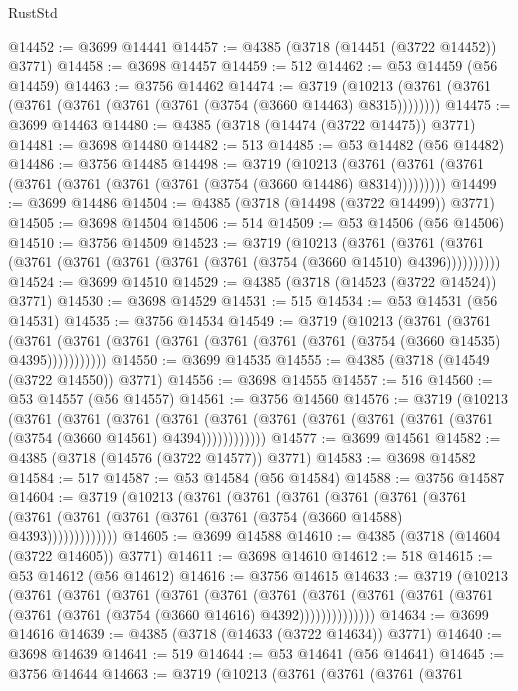 \begin{lexlean}{RustStd}
\begin{coremodule}
@14452 := @3699 @14441
@14457 := @4385 (@3718 (@14451 (@3722 @14452)) @3771)
@14458 := @3698 @14457
@14459 := 512
@14462 := @53 @14459 (@56 @14459)
@14463 := @3756 @14462
@14474 := @3719
    (@10213 (@3761 (@3761 (@3761 (@3761 (@3761 (@3761 (@3754 (@3660 @14463) @8315))))))))
@14475 := @3699 @14463
@14480 := @4385 (@3718 (@14474 (@3722 @14475)) @3771)
@14481 := @3698 @14480
@14482 := 513
@14485 := @53 @14482 (@56 @14482)
@14486 := @3756 @14485
@14498 := @3719
    (@10213 (@3761 (@3761 (@3761 (@3761 (@3761 (@3761 (@3761 (@3754 (@3660 @14486) @8314)))))))))
@14499 := @3699 @14486
@14504 := @4385 (@3718 (@14498 (@3722 @14499)) @3771)
@14505 := @3698 @14504
@14506 := 514
@14509 := @53 @14506 (@56 @14506)
@14510 := @3756 @14509
@14523 := @3719
    (@10213
      (@3761 (@3761 (@3761 (@3761 (@3761 (@3761 (@3761 (@3761 (@3754 (@3660 @14510) @4396))))))))))
@14524 := @3699 @14510
@14529 := @4385 (@3718 (@14523 (@3722 @14524)) @3771)
@14530 := @3698 @14529
@14531 := 515
@14534 := @53 @14531 (@56 @14531)
@14535 := @3756 @14534
@14549 := @3719
    (@10213
      (@3761
        (@3761
          (@3761 (@3761 (@3761 (@3761 (@3761 (@3761 (@3761 (@3754 (@3660 @14535) @4395)))))))))))
@14550 := @3699 @14535
@14555 := @4385 (@3718 (@14549 (@3722 @14550)) @3771)
@14556 := @3698 @14555
@14557 := 516
@14560 := @53 @14557 (@56 @14557)
@14561 := @3756 @14560
@14576 := @3719
    (@10213
      (@3761
        (@3761
          (@3761
            (@3761 (@3761 (@3761 (@3761 (@3761 (@3761 (@3761 (@3754 (@3660 @14561) @4394))))))))))))
@14577 := @3699 @14561
@14582 := @4385 (@3718 (@14576 (@3722 @14577)) @3771)
@14583 := @3698 @14582
@14584 := 517
@14587 := @53 @14584 (@56 @14584)
@14588 := @3756 @14587
@14604 := @3719
    (@10213
      (@3761
        (@3761
          (@3761
            (@3761
              (@3761
                (@3761 (@3761 (@3761 (@3761 (@3761 (@3761 (@3754 (@3660 @14588) @4393)))))))))))))
@14605 := @3699 @14588
@14610 := @4385 (@3718 (@14604 (@3722 @14605)) @3771)
@14611 := @3698 @14610
@14612 := 518
@14615 := @53 @14612 (@56 @14612)
@14616 := @3756 @14615
@14633 := @3719
    (@10213
      (@3761
        (@3761
          (@3761
            (@3761
              (@3761
                (@3761
                  (@3761
                    (@3761 (@3761 (@3761 (@3761 (@3761 (@3754 (@3660 @14616) @4392))))))))))))))
@14634 := @3699 @14616
@14639 := @4385 (@3718 (@14633 (@3722 @14634)) @3771)
@14640 := @3698 @14639
@14641 := 519
@14644 := @53 @14641 (@56 @14641)
@14645 := @3756 @14644
@14663 := @3719
    (@10213
      (@3761
        (@3761
          (@3761
            (@3761

\end{coremodule}
\end{lexlean}
